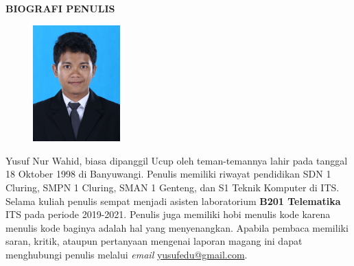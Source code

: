 \begin{center}
  \Large\textbf{BIOGRAFI PENULIS}
\end{center}
\vspace{2ex}


\begin{figure}
  \centering
  \vspace{-3ex}
  \includegraphics[width=0.3\textwidth]{gambar/ynw.jpg}
  \vspace{-4ex}
\end{figure}

\noindent Yusuf Nur Wahid, biasa dipanggil Ucup oleh teman-temannya lahir pada tanggal 18 Oktober 1998 di Banyuwangi.
Penulis memiliki riwayat pendidikan SDN 1 Cluring, SMPN 1 Cluring, SMAN 1 Genteng, dan S1 Teknik Komputer di ITS.
Selama kuliah penulis sempat menjadi asisten laboratorium \textbf{B201 Telematika} ITS pada periode 2019-2021.
Penulis juga memiliki hobi menulis kode karena menulis kode baginya adalah hal yang menyenangkan.
Apabila pembaca memiliki saran, kritik, ataupun pertanyaan mengenai laporan magang ini dapat menghubungi penulis melalui \textit{email} \href{mailto:yusufedu@gmail.com}{yusufedu@gmail.com}.

